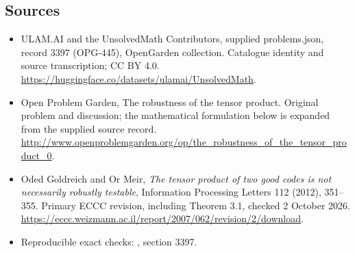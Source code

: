 \documentclass[11pt,a4paper]{article}
\begin{document}
\subsection{Sources}
\begin{itemize}
\item[S1] ULAM.AI and the UnsolvedMath Contributors, supplied problems.json, record 3397 (OPG-445), OpenGarden collection. Catalogue identity and source transcription; CC BY 4.0.
\url{https://huggingface.co/datasets/ulamai/UnsolvedMath}.
\item[S2] Open Problem Garden, The robustness of the tensor product. Original problem and discussion; the mathematical formulation below is expanded from the supplied source record.
\url{http://www.openproblemgarden.org/op/the_robustness_of_the_tensor_product_0}.

\item[R1] Oded Goldreich and Or Meir, \emph{The tensor product of two
good codes is not necessarily robustly testable}, Information Processing
Letters 112 (2012), 351--355. Primary ECCC revision, including Theorem 3.1, checked
2 October 2026.
\url{https://eccc.weizmann.ac.il/report/2007/062/revision/2/download}.
\item[R2] Reproducible exact checks:
, section 3397.

\end{itemize}
\end{document}
